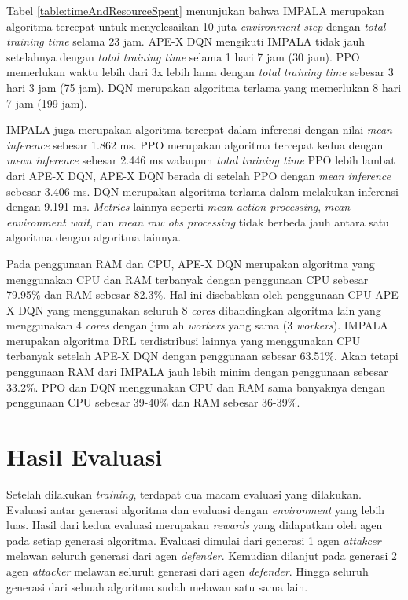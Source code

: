 Tabel \ref{table:timeAndResourceSpent} menunjukan bahwa IMPALA merupakan algoritma tercepat
untuk menyelesaikan 10 juta \emph{environment step} dengan \emph{total training time} selama
23 jam. APE-X DQN mengikuti IMPALA tidak jauh setelahnya dengan \emph{total training time}
selama 1 hari 7 jam (30 jam). PPO memerlukan waktu lebih dari 3x lebih lama dengan \emph{total training time}
sebesar 3 hari 3 jam (75 jam). DQN merupakan algoritma terlama yang memerlukan 8 hari 7 jam (199 jam).

IMPALA juga merupakan algoritma tercepat dalam inferensi dengan nilai \emph{mean inference} sebesar
1.862 ms. PPO merupakan algoritma tercepat kedua dengan \emph{mean inference} sebesar 2.446 ms walaupun \emph{total
training time} PPO lebih lambat dari APE-X DQN, APE-X DQN berada di setelah PPO dengan \emph{mean inference}
sebesar 3.406 ms. DQN merupakan algoritma terlama dalam melakukan inferensi dengan 9.191 ms.
\emph{Metrics} lainnya seperti \emph{mean action processing}, \emph{mean environment wait}, dan \emph{mean raw obs processing}
tidak berbeda jauh antara satu algoritma dengan algoritma lainnya.

Pada penggunaan RAM dan CPU, APE-X DQN merupakan algoritma yang menggunakan CPU dan RAM terbanyak
dengan penggunaan CPU sebesar 79.95\% dan RAM sebesar 82.3\%. Hal ini disebabkan oleh penggunaan CPU
APE-X DQN yang menggunakan seluruh 8 \emph{cores} dibandingkan algoritma lain yang menggunakan 4 \emph{cores}
dengan jumlah \emph{workers} yang sama (3 \emph{workers}). IMPALA merupakan algoritma DRL
terdistribusi lainnya yang menggunakan CPU terbanyak setelah APE-X DQN dengan penggunaan sebesar
63.51\%. Akan tetapi penggunaan RAM dari IMPALA jauh lebih minim dengan penggunaan sebesar 33.2\%.
PPO dan DQN menggunakan CPU dan RAM sama banyaknya dengan penggunaan CPU sebesar 39-40\% dan RAM
sebesar 36-39\%.

\section{Hasil Evaluasi}
Setelah dilakukan \emph{training}, terdapat dua macam evaluasi yang dilakukan.
Evaluasi antar generasi algoritma dan evaluasi dengan \emph{environment} yang lebih luas.
Hasil dari kedua evaluasi merupakan \emph{rewards} yang didapatkan oleh agen pada setiap generasi algoritma.
Evaluasi dimulai dari generasi 1 agen \emph{attakcer} melawan seluruh generasi dari agen \emph{defender}.
Kemudian dilanjut pada generasi 2 agen \emph{attacker} melawan seluruh generasi dari agen \emph{defender}.
Hingga seluruh generasi dari sebuah algoritma sudah melawan satu sama lain.

